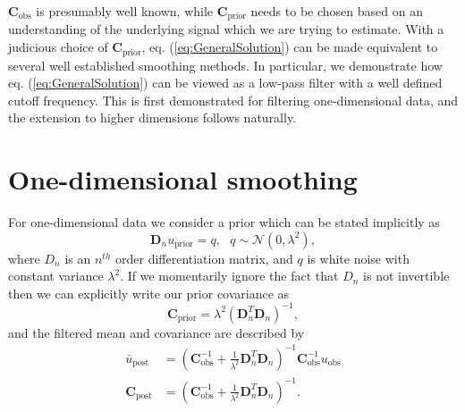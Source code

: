 \documentclass[10pt,a4paper]{article}
\begin{document}
$\mathbf{C}_\mathrm{obs}$ is presumably well known, while $\mathbf{C}_\mathrm{prior}$ needs to be chosen based on an understanding of the underlying signal which we are trying to estimate.  With a judicious choice of $\mathbf{C}_\mathrm{prior}$,  eq. (\ref{eq:GeneralSolution}) can be made equivalent to several well established smoothing methods.  In particular, we demonstrate how eq. (\ref{eq:GeneralSolution}) can be viewed as a low-pass filter with a well defined cutoff frequency. This is first demonstrated for filtering one-dimensional data, and the extension to higher dimensions follows naturally.  

\section*{One-dimensional smoothing}
For one-dimensional data we consider a prior which can be stated implicitly as
\begin{equation}\label{eq:ImplicitPrior1D}
  \mathbf{D}_{n} u_\mathrm{prior} = q, \ \ \ q \sim \mathcal{N}(0,\lambda^2),
\end{equation}  
where $D_n$ is an $n^{th}$ order differentiation matrix, and $q$ is white noise with constant variance $\lambda^2$.  If we momentarily ignore the fact that $D_n$ is not invertible then we can explicitly write our prior covariance as
\begin{equation}\label{eq:ExplicitPrior1D}
\mathbf{C_\mathrm{prior}} = \lambda^2(\mathbf{D}_n^T\mathbf{D}_n)^{-1},
\end{equation}
and the filtered mean and covariance are described by
\begin{equation}\label{eq:1DSolution}
\begin{split}
\bar{u}_\mathrm{post} &= (\mathbf{C}_\mathrm{obs}^{-1} +   
                   \frac{1}{\lambda^2}\mathbf{D}_n^T\mathbf{D}_n)^{-1}\mathbf{C}_\mathrm{obs}^{-1}
                   u_\mathrm{obs}
\\
\mathbf{C}_\mathrm{post} &= (\mathbf{C}_\mathrm{obs}^{-1} +   
                            \frac{1}{\lambda^2}\mathbf{D}_n^T\mathbf{D}_n)^{-1}.
\end{split}
\end{equation}
\end{document}
